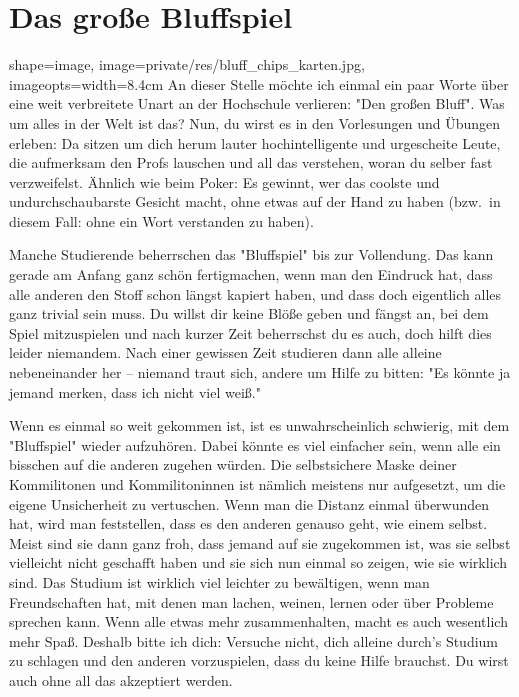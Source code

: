 \section{Das große Bluffspiel}
\begin{pullquote}{shape=image, image=private/res/bluff_chips_karten.jpg, imageopts={width=8.4cm}}
An dieser Stelle möchte ich einmal ein paar Worte über eine weit verbreitete Unart an der Hochschule verlieren: "Den großen Bluff".
Was um alles in der Welt ist das?
Nun, du wirst es in den Vorlesungen und Übungen erleben: Da sitzen um dich herum lauter hochintelligente und urgescheite Leute, die aufmerksam den Profs lauschen und all das verstehen, woran du selber fast verzweifelst.
Ähnlich wie beim Poker: Es gewinnt, wer das coolste und undurchschaubarste Gesicht macht, ohne etwas auf der Hand zu haben (bzw.\ in diesem Fall: ohne ein Wort verstanden zu haben).\pullquotenl

Manche Studierende beherrschen das "Bluffspiel" bis zur Vollendung.
Das kann gerade am Anfang ganz schön fertigmachen, wenn man den Eindruck hat, dass alle anderen den Stoff schon längst kapiert haben, und dass doch eigentlich alles ganz trivial sein muss.
Du willst dir keine Blöße geben und fängst an, bei dem Spiel mitzuspielen und nach kurzer Zeit beherrschst du es auch, doch hilft dies leider niemandem.
Nach einer gewissen Zeit studieren dann alle alleine nebeneinander her -- niemand traut sich, andere um Hilfe zu bitten: "Es könnte ja jemand merken, dass ich nicht viel weiß."%

Wenn es einmal so weit gekommen ist, ist es unwahrscheinlich schwierig, mit dem "Bluffspiel" wieder aufzuhören.
Dabei könnte es viel einfacher sein, wenn alle ein bisschen auf die anderen zugehen würden.
Die selbstsichere Maske deiner Kommilitonen und Kommilitoninnen ist nämlich meistens nur aufgesetzt, um die eigene Unsicherheit zu vertuschen.
Wenn man die Distanz einmal überwunden hat, wird man feststellen, dass es den anderen genauso geht, wie einem selbst.
Meist sind sie dann ganz froh, dass jemand auf sie zugekommen ist, was sie selbst vielleicht nicht geschafft haben und sie sich nun einmal so zeigen, wie sie wirklich sind.
Das Studium ist wirklich viel leichter zu bewältigen, wenn man Freundschaften hat, mit denen man lachen, weinen, lernen oder über Probleme sprechen kann.
Wenn alle etwas mehr zusammenhalten, macht es auch wesentlich mehr Spaß.
Deshalb bitte ich dich: Versuche nicht, dich alleine durch's Studium zu schlagen und den anderen vorzuspielen, dass du keine Hilfe brauchst.
Du wirst auch ohne all das akzeptiert werden.\pullquotenl
\pullquotenl

\pullquotenl
\end{pullquote}
